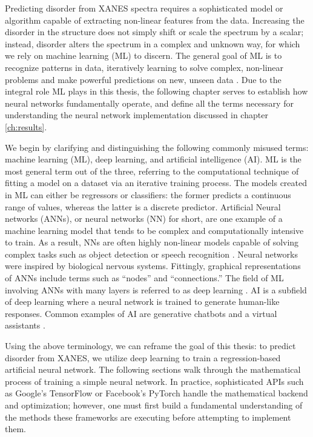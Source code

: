 Predicting disorder from XANES spectra requires a sophisticated model or algorithm capable of extracting non-linear features from the data. Increasing the disorder in the structure does not simply shift or scale the spectrum by a scalar; instead, disorder alters the spectrum in a complex and unknown way, for which we rely on machine learning  (ML) to discern. The general goal of ML is to recognize patterns in data, iteratively learning to solve complex, non-linear problems and make powerful predictions on new, unseen data \cite{ML-and-the-physical-sci}. Due to the integral role ML plays in this thesis, the following chapter serves to establish how neural networks fundamentally operate, and define all the terms necessary for understanding the neural network implementation discussed in chapter \ref{ch:results}.

We begin by clarifying and distinguishing the following commonly misused terms: machine learning (ML), deep learning, and artificial intelligence (AI). ML is the most general term out of the three, referring to the computational technique of fitting a model on a dataset via an iterative training process. The models created in ML can either be regressors or classifiers: the former predicts a continuous range of values, whereas the latter is a discrete predictor. Artificial Neural networks (ANNs), or neural networks (NN) for short, are one example of a machine learning model that tends to be complex and computationally intensive to train. As a result, NNs are often highly non-linear models capable of solving complex tasks such as object detection \cite{szegedy2013deep} or speech recognition \cite{ms-speech-recognition-paper} \cite{speech-recognition}. Neural networks were inspired by biological nervous systems. Fittingly, graphical representations of ANNs include terms such as ``nodes'' and ``connections.'' The field of ML involving ANNs with many layers is referred to as deep learning \cite{schmidhuber2015deep}. AI is a subfield of deep learning where a neural network is trained to generate human-like responses. Common examples of AI are generative chatbots \cite{chatbots} and a virtual assistants \cite{virtual-assistants} \cite{virtual-assistants2}. 

Using the above terminology, we can reframe the goal of this thesis: to predict disorder from XANES, we utilize deep learning to train a regression-based artificial neural network. The following sections walk through the mathematical process of training a simple neural network. In practice, sophisticated APIs such as Google's TensorFlow \cite{tensorflow2015-whitepaper} or Facebook's PyTorch \cite{pytorch-paper} handle the mathematical backend and optimization; however, one must first build a fundamental understanding of the methods these frameworks are executing before attempting to implement them.

